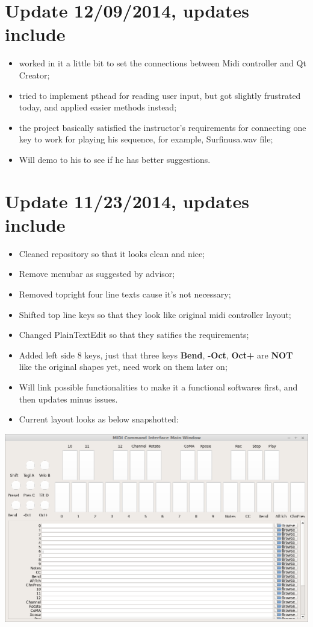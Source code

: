 \documentclass[9pt,b5paper]{article}
\begin{document}
\section{Update 12/09/2014, updates include}
\label{sec-2}
\begin{itemize}
\item worked in it a little bit to set the connections between Midi controller and Qt Creator;
\item tried to implement pthead for reading user input, but got slightly frustrated today, and applied easier methods instead;
\item the project basically satisfied the instructor's requirements for connecting one key to work for playing his sequence, for example, Surfinusa.wav file;
\item Will demo to his to see if he has better suggestions.
\end{itemize}

\section{Update 11/23/2014, updates include}
\label{sec-3}
\begin{itemize}
\item Cleaned repository so that it looks clean and nice;
\item Remove menubar as suggested by advisor;
\item Removed topright four line texts cause it's not necessary;
\item Shifted top line keys so that they look like original midi controller layout;
\item Changed PlainTextEdit so that they satifies the requirements;
\item Added left side 8 keys, just that three keys \textbf{Bend}, \textbf{-Oct}, \textbf{Oct+} are \textbf{NOT} like the original shapes yet, need work on them later on;
\item Will link possible functionalities to make it a functional softwares first, and then updates minus issues.
\item Current layout looks as below snapshotted:
\end{itemize}

\includegraphics[width=.9\linewidth]{./pic/Screenshot_from_2014-11-23_13:20:06.png}  
\end{document}
